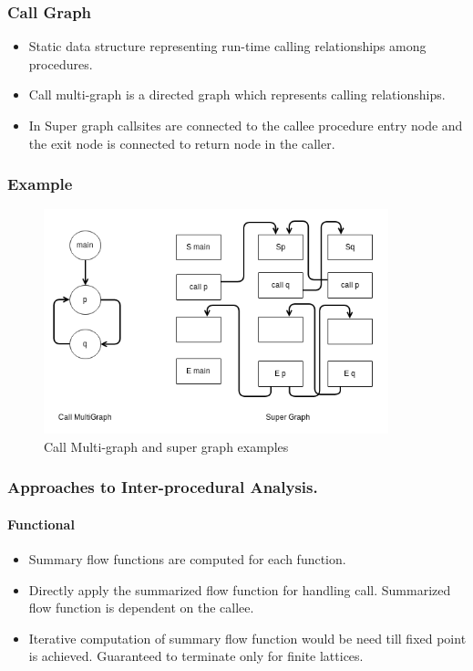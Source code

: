 \documentclass{beamer}
\begin{document}
  \begin{frame}
  \frametitle{Call Graph}
  \begin{itemize}
  	\item Static data structure representing run-time calling relationships among procedures.
  	\item Call multi-graph is a directed graph which represents calling relationships.
  	\item In Super graph callsites are connected to the callee procedure entry node and the exit node is connected to return node in the caller.
  \end{itemize}

  \end{frame}

  \begin{frame}
  \frametitle{Example}
  		\begin{figure}[here]
  			\begin{center}
  				\includegraphics[width=10cm]{Figures/callgraph.png}
  			\end{center}
  			\caption{Call Multi-graph and super graph examples}
  			\label{fig:cmg_sg}
  		\end{figure}
  \end{frame}
  
  \begin{frame}
  \frametitle{Approaches to Inter-procedural Analysis.}
  \framesubtitle{Functional}
  \begin{itemize}
  	\item Summary flow functions are computed for each function. 
  	\item Directly apply the summarized flow function for handling call. Summarized flow function is dependent on the callee.
  	\item Iterative computation of summary flow function would be need till fixed point is achieved. Guaranteed to terminate only for finite lattices. 
  \end{itemize}	

  \end{frame}
\end{document}
